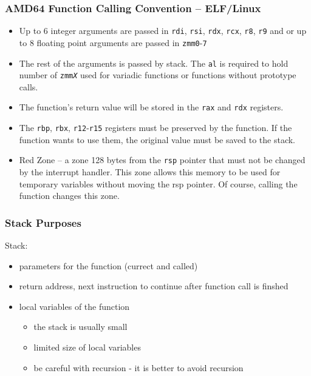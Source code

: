 \documentclass{beamer}
\begin{document}
\begin{frame}
\frametitle{AMD64 Function Calling Convention -- ELF/Linux}

\begin{itemize}
\item Up to 6 integer arguments are passed in \texttt{rdi}, \texttt{rsi}, \texttt{rdx}, \texttt{rcx}, \texttt{r8}, \texttt{r9} and or up to 8 floating point arguments are passed in \texttt{zmm0}-\texttt{7}
\item The rest of the arguments is passed by stack. The \texttt{al} is required to hold number of \texttt{zmm\textit{X}} used for variadic functions or functions without prototype calls.
\end{itemize}

\medskip

\begin{itemize}
\item The function's return value will be stored in the \texttt{rax} and \texttt{rdx} registers.
\item The \texttt{rbp}, \texttt{rbx}, \texttt{r12}-\texttt{r15} registers must be preserved by the function. If the function wants to use them, the original value must be saved to the stack.
\item Red Zone -- a zone 128 bytes from the \texttt{rsp} pointer that must not be changed by the interrupt handler. This zone allows this memory to be used for temporary variables without moving the rsp pointer.
Of course, calling the function changes this zone.
\end{itemize}

\end{frame}



\begin{frame}
\frametitle{Stack Purposes}

Stack:
\begin{itemize}
  \item parameters for the function (currect and called)
  \item return address, next instruction to continue after function call is finshed
  \item local variables of the function
  \begin{itemize}
     \item the stack is usually small
     \item limited size of local variables
     \item be careful with recursion - it is better to avoid recursion
  \end{itemize}
\end{itemize}

\end{frame}
\end{document}
